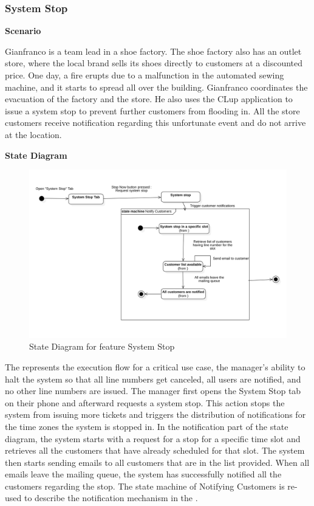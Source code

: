 \subsubsection{System Stop}

\textbf{Scenario}

Gianfranco is a team lead in a shoe factory.
The shoe factory also has an outlet store, where the local brand sells its shoes directly to customers at a discounted price.
One day, a fire erupts due to a malfunction in the automated sewing machine, and it starts to spread all over the building.
Gianfranco coordinates the evacuation of the factory and the store.
He also uses the CLup application to issue a system stop to prevent further customers from flooding in.
All the store customers receive notification regarding this unfortunate event and do not arrive at the location.

\textbf{State Diagram}

\begin{figure}[H]
    \centering
    \includegraphics[height=0.4\textwidth]{Images/StateCharts/SystemStop.png}
    \caption{State Diagram for feature System Stop}
    \label{fig:SDSystemStop}
\end{figure}

The  represents the execution flow for a critical use case, the manager's ability to halt the system so that all line numbers get canceled, all users are notified, and no other line numbers are issued.
The manager first opens the System Stop tab on their phone and afterward requests a system stop.
This action stops the system from issuing more tickets and triggers the distribution of notifications for the time zones the system is stopped in.
In the notification part of the state diagram, the system starts with a request for a stop for a specific time slot and retrieves all the customers that have already scheduled for that slot.
The system then starts sending emails to all customers that are in the list provided.
When all emails leave the mailing queue, the system has successfully notified all the customers regarding the stop.
The state machine of Notifying Customers is re-used to describe the notification mechanism in the .

